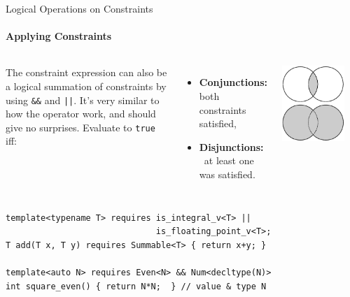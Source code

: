 \documentclass{beamer}
\begin{document}
    \begin{frame}[fragile]{Logical Operations on Constraints}
        \framesubtitle{Applying Constraints}
        \begin{columns}
            The constraint expression can also be a logical summation of constraints by using \texttt{\&\&} and \texttt{||}. It's very similar to how the operator work, and should give no surprises. Evaluate to \texttt{true} iff:
            \vspace{-0.9em}
            \begin{itemize}
                \item{\textbf{Conjunctions:} both constraints satisfied,}
                \item{\textbf{Disjunctions:} \ at least one was satisfied.}
            \end{itemize}
            \begin{center}
                \includegraphics[width=0.815\textwidth]{figures/logical.eps}
            \vspace{1.0em}
            \end{center}
        \end{columns}
        \begin{center}
            \vspace{-1.0em}
            \begin{lstlisting}
template<typename T> requires is_integral_v<T> ||
                              is_floating_point_v<T>;
T add(T x, T y) requires Summable<T> { return x+y; }

template<auto N> requires Even<N> && Num<decltype(N)>
int square_even() { return N*N;  } // value & type N \end{lstlisting}
        \end{center}
    \end{frame}
\end{document}
